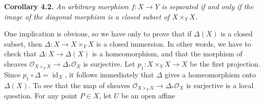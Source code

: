{\medskip
\noindent\hypertarget{result-II-4.2}{}\textbf{Corollary 4.2.} \emph{An arbitrary morphism $f\colon X\to Y$ is separated if and only if the image of the diagonal morphism is a closed subset of $X\times_Y X$.}

\Proof One implication is obvious, so we have only to prove that if $\Delta(X)$ is a closed subset, then $\Delta\colon X\to X\times_Y X$ is a closed immersion. In other words, we have to check that $\Delta\colon X\to\Delta(X)$ is a homeomorphism, and that the morphism of sheaves $\mathcal O_{X\times_Y X}\to\Delta_*\mathcal O_X$ is surjective. Let $p_1\colon X\times_Y X\to X$ be the first projection. Since $p_1\circ\Delta=\operatorname{id}_X$, it follows immediately that $\Delta$ gives a homeomorphism onto $\Delta(X)$. To see that the map of sheaves $\mathcal O_{X\times_Y X}\to\Delta_*\mathcal O_X$ is surjective is a local question. For any point $P\in X$, let $U$ be an open affine
}
